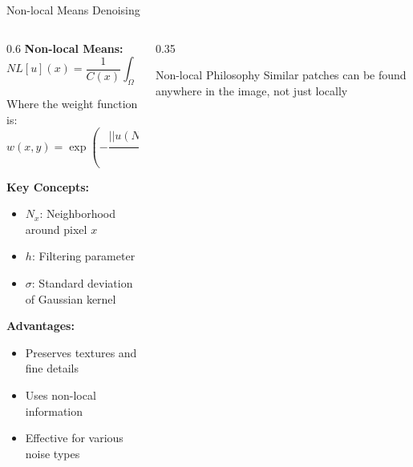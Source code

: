 \documentclass[aspectratio=169,10pt]{beamer}
\begin{document}
\begin{frame}{Non-local Means Denoising}
    \begin{columns}[T]
        \begin{column}{0.6\textwidth}
            \textbf{Non-local Means:}
            $$NL[u](x) = \frac{1}{C(x)} \int_\Omega w(x,y) u(y) dy$$

            Where the weight function is:
            $$w(x,y) = \exp\left(-\frac{||u(N_x) - u(N_y)||^2_{2,\sigma}}{h^2}\right)$$

            \textbf{Key Concepts:}
            \begin{itemize}
                \item $N_x$: Neighborhood around pixel $x$
                \item $h$: Filtering parameter
                \item $\sigma$: Standard deviation of Gaussian kernel
            \end{itemize}

            \textbf{Advantages:}
            \begin{itemize}
                \item Preserves textures and fine details
                \item Uses non-local information
                \item Effective for various noise types
            \end{itemize}
        \end{column}
        \begin{column}{0.35\textwidth}
            \begin{keypoint}{Non-local Philosophy}{}
                Similar patches can be found anywhere in the image, not just locally
            \end{keypoint}
        \end{column}
    \end{columns}
\end{frame}
\end{document}

